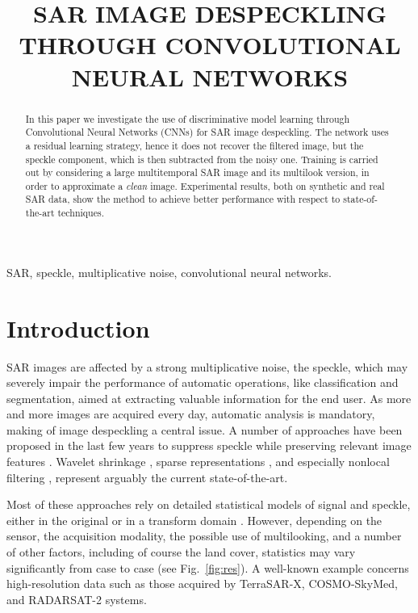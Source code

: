 \documentclass{article}
\title{SAR IMAGE DESPECKLING THROUGH CONVOLUTIONAL NEURAL NETWORKS}
\begin{document}
\maketitle
\begin{abstract}
In this paper we investigate the use of discriminative model learning through Convolutional Neural Networks (CNNs) for SAR image despeckling.
The network uses a residual learning strategy,
hence it does not recover the filtered image,
but the speckle component, which is then subtracted from the noisy one.
Training is carried out by considering a large multitemporal SAR image
and its multilook version, in order to approximate a {\em clean} image.
Experimental results, both on synthetic and real SAR data, show the method
to achieve better performance with respect to state-of-the-art techniques.
\end{abstract}
\begin{keywords}
SAR, speckle, multiplicative noise, convolutional neural networks.
\end{keywords}

\section{Introduction}
SAR images are affected by a strong multiplicative noise, the speckle,
which may severely impair the performance of automatic operations, like classification and segmentation, aimed at extracting valuable information for the end user.
As more and more images are acquired every day, automatic analysis is mandatory, making of image despeckling a central issue.
A number of approaches have been proposed in the last few years to suppress speckle while preserving relevant image features \cite{Argenti2013}.
Wavelet shrinkage \cite{Bianchi2008}, sparse representations \cite{Foucher2008}, and especially nonlocal filtering \cite{Deledalle2009, Parrilli2012, Cozzolino2014, Deledalle2015},
represent arguably the current state-of-the-art.

Most of these approaches rely on detailed statistical models of signal and speckle, either in the original or in a transform domain \cite{Argenti2013}.
However, depending on the sensor, the acquisition modality, the possible use of multilooking, and a number of other factors, including of course the land cover,
statistics may vary significantly from case to case (see Fig.~\ref{fig:res}).
A well-known example concerns high-resolution data such as those acquired by TerraSAR-X, COSMO-SkyMed, and RADARSAT-2 systems.
\end{document}
